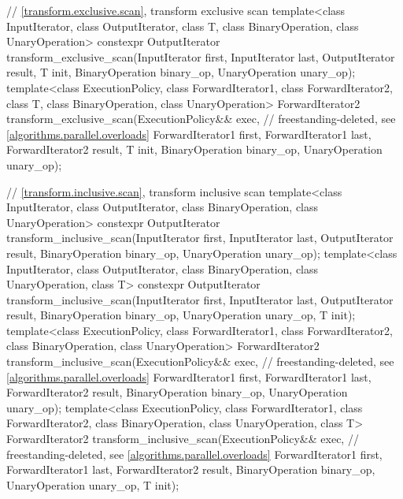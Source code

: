 \begin{codeblock}
{  // \ref{transform.exclusive.scan}, transform exclusive scan
  template<class InputIterator, class OutputIterator, class T,
           class BinaryOperation, class UnaryOperation>
    constexpr OutputIterator
      transform_exclusive_scan(InputIterator first, InputIterator last,
                               OutputIterator result, T init,
                               BinaryOperation binary_op, UnaryOperation unary_op);
  template<class ExecutionPolicy, class ForwardIterator1, class ForwardIterator2, class T,
           class BinaryOperation, class UnaryOperation>
    ForwardIterator2
      transform_exclusive_scan(ExecutionPolicy&& exec,          // freestanding-deleted, see \ref{algorithms.parallel.overloads}
                               ForwardIterator1 first, ForwardIterator1 last,
                               ForwardIterator2 result, T init,
                               BinaryOperation binary_op, UnaryOperation unary_op);

  // \ref{transform.inclusive.scan}, transform inclusive scan
  template<class InputIterator, class OutputIterator,
           class BinaryOperation, class UnaryOperation>
    constexpr OutputIterator
      transform_inclusive_scan(InputIterator first, InputIterator last,
                               OutputIterator result,
                               BinaryOperation binary_op, UnaryOperation unary_op);
  template<class InputIterator, class OutputIterator,
           class BinaryOperation, class UnaryOperation, class T>
    constexpr OutputIterator
      transform_inclusive_scan(InputIterator first, InputIterator last,
                               OutputIterator result,
                               BinaryOperation binary_op, UnaryOperation unary_op, T init);
  template<class ExecutionPolicy, class ForwardIterator1, class ForwardIterator2,
           class BinaryOperation, class UnaryOperation>
    ForwardIterator2
      transform_inclusive_scan(ExecutionPolicy&& exec,          // freestanding-deleted, see \ref{algorithms.parallel.overloads}
                               ForwardIterator1 first, ForwardIterator1 last,
                               ForwardIterator2 result, BinaryOperation binary_op,
                               UnaryOperation unary_op);
  template<class ExecutionPolicy, class ForwardIterator1, class ForwardIterator2,
           class BinaryOperation, class UnaryOperation, class T>
    ForwardIterator2
      transform_inclusive_scan(ExecutionPolicy&& exec,          // freestanding-deleted, see \ref{algorithms.parallel.overloads}
                               ForwardIterator1 first, ForwardIterator1 last,
                               ForwardIterator2 result,
                               BinaryOperation binary_op, UnaryOperation unary_op, T init);

}
\end{codeblock}
